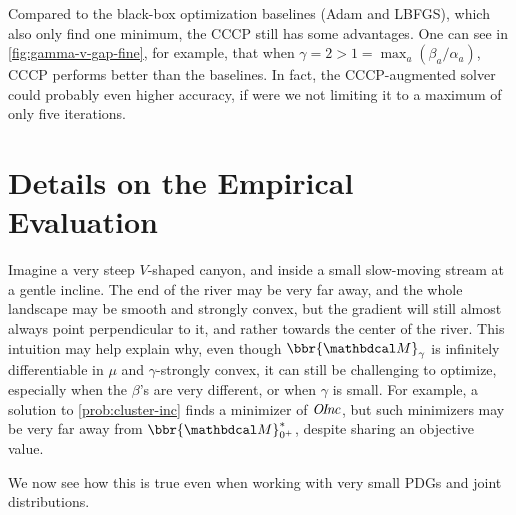 \begin{subappendices}
Compared to the black-box optimization baselines (Adam and LBFGS),
 which also only find one minimum,
    the CCCP still has some advantages.
One can see in \cref{fig:gamma-v-gap-fine}, for example, that when $\gamma = 2 > 1 = \max_a {(\beta_a / \alpha_a)}$,
CCCP performs better than the baselines.
In fact, the CCCP-augmented
solver
could probably even higher accuracy,
    if were we not limiting it to
    a maximum of only five iterations.


\section{Details on the Empirical Evaluation}\label{sec:expt-setup}
Imagine a very steep $V$-shaped canyon, and inside a small slow-moving stream at a gentle incline. The end of the river may be very far away, and the whole landscape may be smooth and strongly convex, but the gradient will still almost always point perpendicular to it, and rather towards the center of the river.
This intuition may help explain why, even though $\bbr{\dg M}_\gamma$ is infinitely differentiable in $\mu$ and $\gamma$-strongly convex, it can still be challenging to optimize, especially when the $\beta$'s are very different, or when $\gamma$ is small.
For example, a solution to \eqref{prob:cluster-inc} finds a minimizer of $\mathit{O\mskip-2.5muI\mskip-3.5mun\mskip-1.7muc}$, but such minimizers may be very far away from $\bbr{\dg M}_{0^+}^*$, despite sharing an objective value.

We now see how this is true even when working with very small PDGs and joint distributions.



\end{subappendices}
